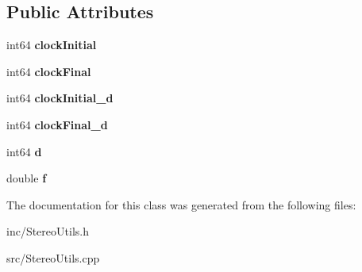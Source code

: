 \subsection*{Public Attributes}
\begin{DoxyCompactItemize}
\item 
int64 {\bfseries clock\+Initial}\hypertarget{class_stereo_utils_1_1_time_aeee8c2529192336c91ee59e9a2a2d9d4}{}\label{class_stereo_utils_1_1_time_aeee8c2529192336c91ee59e9a2a2d9d4}

\item 
int64 {\bfseries clock\+Final}\hypertarget{class_stereo_utils_1_1_time_a36304edf947ce531a08fddab291cd90d}{}\label{class_stereo_utils_1_1_time_a36304edf947ce531a08fddab291cd90d}

\item 
int64 {\bfseries clock\+Initial\+\_\+d}\hypertarget{class_stereo_utils_1_1_time_a53d830a50f304c24adee4d005b329d07}{}\label{class_stereo_utils_1_1_time_a53d830a50f304c24adee4d005b329d07}

\item 
int64 {\bfseries clock\+Final\+\_\+d}\hypertarget{class_stereo_utils_1_1_time_af7658b229732620deee17078d388badb}{}\label{class_stereo_utils_1_1_time_af7658b229732620deee17078d388badb}

\item 
int64 {\bfseries d}\hypertarget{class_stereo_utils_1_1_time_aaf6dd4d4ebb54cf2ec93186fa36bd014}{}\label{class_stereo_utils_1_1_time_aaf6dd4d4ebb54cf2ec93186fa36bd014}

\item 
double {\bfseries f}\hypertarget{class_stereo_utils_1_1_time_a59464d8bf787a21394a72731b8fde1fa}{}\label{class_stereo_utils_1_1_time_a59464d8bf787a21394a72731b8fde1fa}

\end{DoxyCompactItemize}


The documentation for this class was generated from the following files\+:\begin{DoxyCompactItemize}
\item 
inc/Stereo\+Utils.\+h\item 
src/Stereo\+Utils.\+cpp\end{DoxyCompactItemize}

